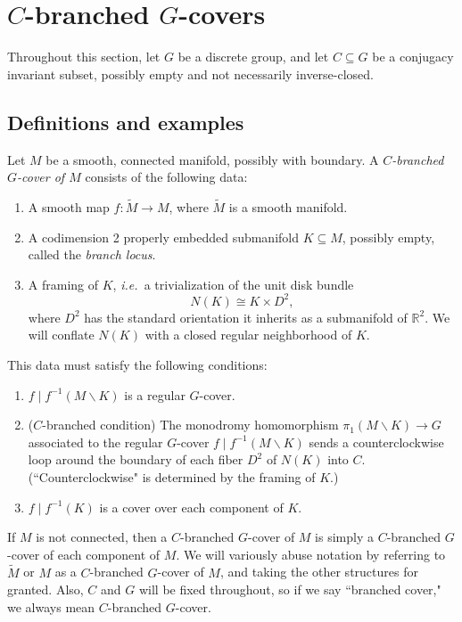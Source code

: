 \documentclass[10pt,twocolumn,amsmath,amssymb,aps,pra,secnumarabic,
    nofootinbib,groupedaddress]{revtex4-1}
\newcommand{\ie}{\emph{i.e.~}}
\renewcommand{\setminus}{\smallsetminus}
\begin{document}

\section{$C$-branched $G$-covers}
\label{s:brand}
Throughout this section, let $G$ be a discrete group, and let $C \subseteq G$ be a conjugacy invariant subset, possibly empty and not necessarily inverse-closed.

\subsection{Definitions and examples}
\label{ss:defn}
Let $M$ be a smooth, connected manifold, possibly with boundary.  A \emph{$C$-branched $G$-cover of $M$} consists of the following data:
\begin{enumerate}
\item A smooth map $f:\tilde{M} \to M$, where $\tilde{M}$ is a smooth manifold.
\item A codimension 2 properly embedded submanifold $K \subseteq M$, possibly empty, called the \emph{branch locus}.
\item A framing of $K$, \ie a trivialization of the unit disk bundle
\[N(K) \cong K \times D^2, \]
where $D^2$ has the standard orientation it inherits as a submanifold of $\mathbb{R}^2$.  We will conflate $N(K)$ with a closed regular neighborhood of $K$.
\end{enumerate}
This data must satisfy the following conditions:
\begin{enumerate}
\item $f\mid f^{-1}(M\setminus K)$ is a regular $G$-cover.
\item ($C$-branched condition) The monodromy homomorphism $\pi_1(M \setminus K) \to G$ associated to the regular $G$-cover $f\mid f^{-1}(M\setminus K)$ sends a counterclockwise loop around the boundary of each fiber $D^2$ of $N(K)$ into $C$.  (``Counterclockwise" is determined by the framing of $K$.)
\item $f\mid f^{-1}(K)$ is a cover over each component of $K$.
\end{enumerate}
If $M$ is not connected, then a $C$-branched $G$-cover of $M$ is simply a $C$-branched $G$-cover of each component of $M$.  We will variously abuse notation by referring to $\tilde{M}$ or $M$ as a $C$-branched $G$-cover of $M$, and taking the other structures for granted.  Also, $C$ and $G$ will be fixed throughout, so if we say ``branched cover," we always mean $C$-branched $G$-cover.
\end{document}
